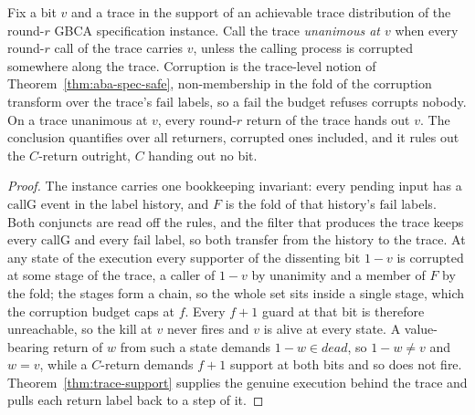 \begin{theorem}
  \label{thm:gbca-spec-validity}
  \leanok
  Fix a bit $v$ and a trace in the support of an achievable trace distribution of the round-$r$ GBCA specification instance.
  Call the trace \emph{unanimous at $v$} when every round-$r$ call of the trace carries $v$, unless the calling process is corrupted somewhere along the trace.\leanok{}
  Corruption is the trace-level notion of Theorem~\ref{thm:aba-spec-safe}, non-membership in the fold of the corruption transform over the trace's $\mathrm{fail}$ labels, so a $\mathrm{fail}$ the budget refuses corrupts nobody.\leanok{}
  On a trace unanimous at $v$, every round-$r$ return of the trace hands out $v$.\leanok{}
  The conclusion quantifies over all returners, corrupted ones included, and it rules out the $C$-return outright, $C$ handing out no bit.\leanok{}
\end{theorem}

\begin{proof}\leanok
  The instance carries one bookkeeping invariant: every pending input has a $\mathrm{callG}$ event in the label history, and $F$ is the fold of that history's $\mathrm{fail}$ labels.\leanok{}
  Both conjuncts are read off the rules, and the filter that produces the trace keeps every $\mathrm{callG}$ and every $\mathrm{fail}$ label, so both transfer from the history to the trace.
  At any state of the execution every supporter of the dissenting bit $1-v$ is corrupted at some stage of the trace, a caller of $1-v$ by unanimity and a member of $F$ by the fold; the stages form a chain, so the whole set sits inside a single stage, which the corruption budget caps at $f$.\leanok{}
  Every $f{+}1$ guard at that bit is therefore unreachable, so the kill at $v$ never fires and $v$ is alive at every state.\leanok{}
  A value-bearing return of $w$ from such a state demands $1-w \in dead$, so $1-w \neq v$ and $w = v$, while a $C$-return demands $f{+}1$ support at both bits and so does not fire.\leanok{}
  Theorem~\ref{thm:trace-support} supplies the genuine execution behind the trace and pulls each return label back to a step of it.
\end{proof}
